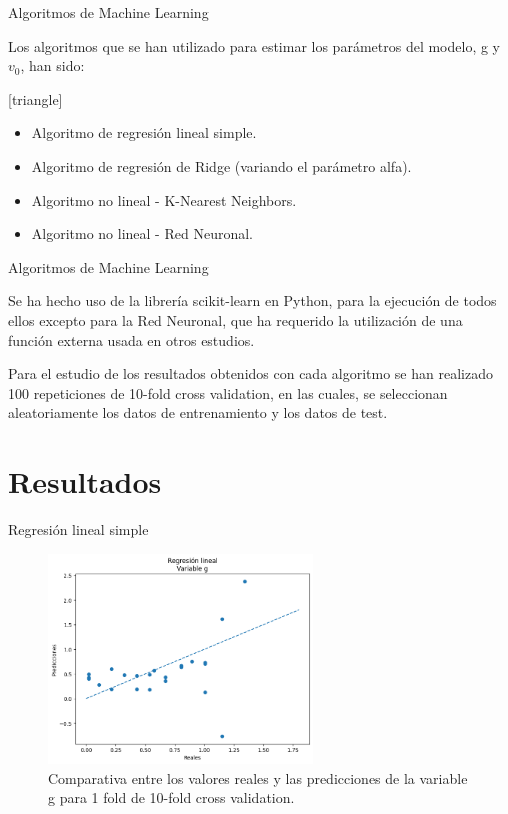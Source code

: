 \documentclass{beamer}
\begin{document}
\begin{frame}{Algoritmos de Machine Learning}

Los algoritmos que se han utilizado para estimar los parámetros del modelo, g y $v_0$, han sido:

\vfill
\pause
{}[triangle]
    \begin{itemize}
        \item Algoritmo de regresión lineal simple.
        \vspace{2mm}
        \pause
        \item Algoritmo de regresión de Ridge (variando el parámetro alfa).
        \vspace{2mm}
        \pause
        \item Algoritmo no lineal - K-Nearest Neighbors.
        \vspace{2mm}  
        \pause
        \item Algoritmo no lineal - Red Neuronal.
        \vspace{2mm} 
    \end{itemize}  
 \pause

\end{frame}

\begin{frame}{Algoritmos de Machine Learning}

Se ha hecho uso de la librería scikit-learn en Python, para la ejecución de todos ellos excepto para la Red Neuronal, que ha requerido la utilización de una función externa usada en otros estudios.

Para el estudio de los resultados obtenidos con cada algoritmo se han realizado 100 repeticiones de 10-fold cross validation, en las cuales, se seleccionan aleatoriamente los datos de entrenamiento y los datos de test.

\end{frame}

\section{Resultados}
 
\begin{frame}{Regresión lineal simple}
    
\begin{figure}
\centering
\includegraphics[width=7cm]{memoria/images/Regresión lineal Variable g.png}
\caption{Comparativa entre los valores reales y las predicciones de la variable g para 1 fold de 10-fold cross validation.}
\end{figure}

\end{frame}
\end{document}
